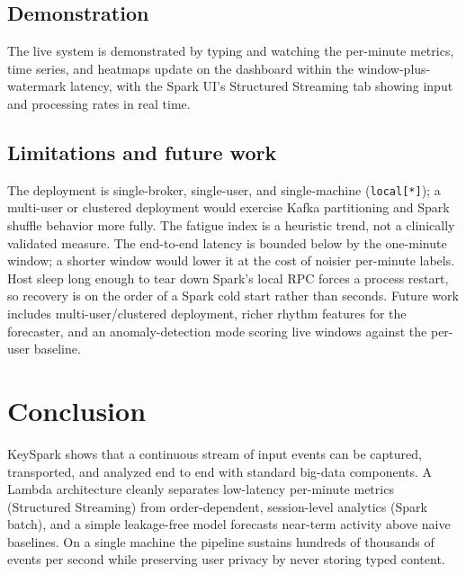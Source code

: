\documentclass[conference]{IEEEtran}
\begin{document}
\subsection{Demonstration}
The live system is demonstrated by typing and watching the per-minute
metrics, time series, and heatmaps update on the dashboard within the
window-plus-watermark latency, with the Spark UI's Structured Streaming
tab showing input and processing rates in real time.

\subsection{Limitations and future work}
The deployment is single-broker, single-user, and single-machine
(\texttt{local[*]}); a multi-user or clustered deployment would exercise
Kafka partitioning and Spark shuffle behavior more fully. The fatigue
index is a heuristic trend, not a clinically validated measure. The
end-to-end latency is bounded below by the one-minute window; a shorter
window would lower it at the cost of noisier per-minute labels. Host
sleep long enough to tear down Spark's local RPC forces a process restart,
so recovery is on the order of a Spark cold start rather than seconds.
Future work includes multi-user/clustered deployment, richer rhythm
features for the forecaster, and an anomaly-detection mode scoring live
windows against the per-user baseline.

\section{Conclusion}
\label{sec:conclusion}
KeySpark shows that a continuous stream of input events can be
captured, transported, and analyzed end to end with standard big-data
components. A Lambda architecture cleanly separates low-latency per-minute
metrics (Structured Streaming) from order-dependent, session-level
analytics (Spark batch), and a simple leakage-free model forecasts
near-term activity above naive baselines. On a single machine the pipeline
sustains hundreds of thousands of events per second while preserving user
privacy by never storing typed content.



\end{document}
